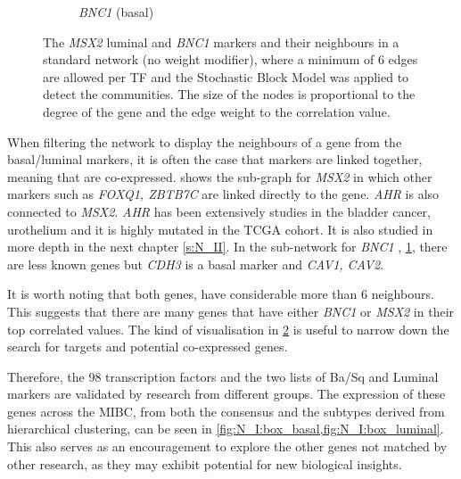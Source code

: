\begin{figure}[!t]
\begin{subfigure}[!t]{0.49\textwidth}
        \caption{\textit{BNC1} (basal)}
        \label{fig:N_I:net_BNC1}
    \end{subfigure}
    \caption{The \textit{MSX2} luminal and \textit{BNC1} markers and their neighbours in a standard network (no weight modifier), where a minimum of 6 edges are allowed per TF and the Stochastic Block Model was applied to detect the communities. The size of the nodes is proportional to the degree of the gene and the edge weight to the correlation value.}
    
    \label{fig:N_I:net_neighbours}
\end{figure}

When filtering the network to display the neighbours of a  gene from the basal/luminal markers, it is often the case that markers are linked together, meaning that are co-expressed.  shows the sub-graph for \textit{MSX2} in which other markers such as \textit{FOXQ1, ZBTB7C} are linked directly to the gene. \textit{AHR} is also connected to \textit{MSX2}. \textit{AHR} has been extensively studies in the bladder cancer, urothelium and it is highly mutated in the TCGA cohort. It is also studied in more depth in the next chapter \ref{s:N_II}. In the sub-network for \textit{BNC1} , \cref{fig:N_I:net_BNC1}, there are less known genes but \textit{CDH3} is a basal marker \citep{Dadhania2016-cb} and \textit{CAV1, CAV2}. 

It is worth noting that both genes, have considerable more than 6 neighbours. This suggests that there are many genes that have either \textit{BNC1} or \textit{MSX2} in their top correlated values. The kind of visualisation in \cref{fig:N_I:net_neighbours} is useful to narrow down the search for targets and potential co-expressed genes.


Therefore, the 98 transcription factors and the two lists of Ba/Sq and Luminal markers are validated by research from different groups. The expression of these genes across the MIBC, from both the consensus and the subtypes derived from hierarchical clustering, can be seen in \cref{fig:N_I:box_basal,fig:N_I:box_luminal}. This also serves as an encouragement to explore the other genes not matched by other research, as they may exhibit potential for new biological insights.


